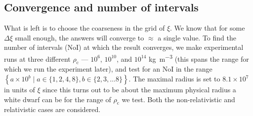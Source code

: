 \documentclass[]{article}
\newcommand{\rhoCentre}{\rho_\mathrm{c}}
\begin{document}
\subsection{Convergence and number of intervals}\label{subsec:convergence}
	What is left is to choose the coarseness in the grid of $\xi$. We know that for some $\Delta \xi$ small enough, the answers will converge to $\approx$ a single value. To find the number of intervals (NoI) at which the result converges, we make experimental runs at three different $\rhoCentre$ --- $10^6$, $10^{10}$, and $10^{14}$ \si{kg.m^{-3}} (this spans the range for which we run the experiment later), and test for an NoI in the range $\left\{a \times 10^b \mid a \in \{1,2,4,8\}, b \in \{2,3,\ldots 8\}\right\}$. The maximal radius is set to $8.1 \times 10^7$ in units of $\xi$ since this turns out to be about the maximum physical radius a white dwarf can be for the range of $\rhoCentre$ we test. Both the non-relativistic and relativistic cases are considered.
\end{document}
